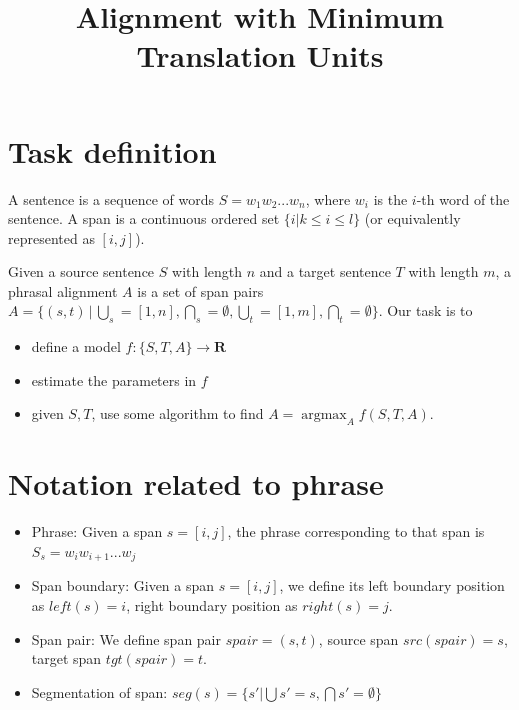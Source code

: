 \documentclass[11pt, letterpaper]{article}   	%
\title{Alignment with Minimum Translation Units}
\begin{document}
\maketitle
\section{Task definition}
A sentence is a sequence of words $S=w_1 w_2 ... w_n $, where $w_i$ is the $i$-th word of the sentence. 
A span is a continuous ordered set $\{i|k\leqslant i \leqslant l\}$ (or equivalently represented as $[i,j]$). 

Given a source sentence $S$ with length $n$ and a target sentence $T$ with length $m$, a phrasal alignment $A$ is a set of span pairs $A=\{(s,t) \, | \, \bigcup_{s} = [1,n], \bigcap_{s} = \emptyset,  \bigcup_{t} = [1,m], \bigcap_{t} = \emptyset \}$. Our task is to 
\begin{itemize} 
\item define a model $f: \{S,T,A\} \rightarrow \mathbf{R}$
\item estimate the parameters in $f$
\item given $S,T$, use some algorithm to find $A=\operatorname*{argmax}_{A} f(S,T,A)$.
\end{itemize}
 
\section{Notation related to phrase}

\begin{itemize}

\item Phrase: Given a span $s=[i,j]$, the phrase corresponding to  that span is $S_s=w_i w_{i+1}...w_j$

\item Span boundary: Given a span $s=[i,j]$, we define its left boundary position as $left(s)=i$, right boundary position as $right(s)=j$. 

\item Span pair: We define span pair $spair=(s,t)$, source span $src(spair)=s$, target span $tgt(spair)=t$.

\item Segmentation of span: $seg(s)=\{s'| \bigcup s' = s, \bigcap s' = \emptyset\}$
\end{itemize}
\end{document}
